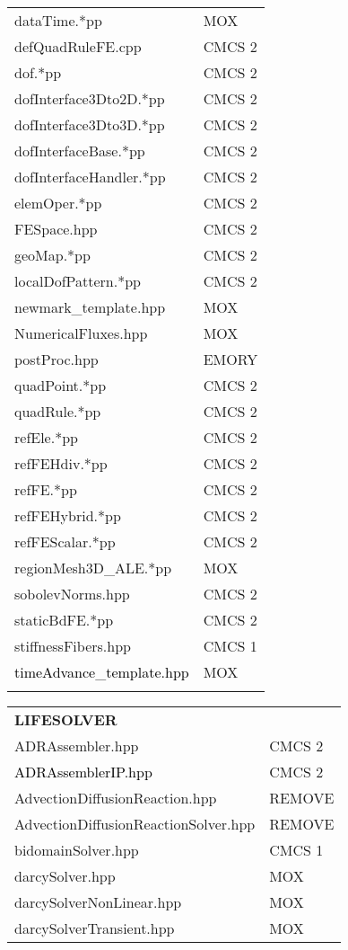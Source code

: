 \documentclass[10p]{article}
\newcommand{\newparts}[1]{\textcolor{black}{#1}}
\newcommand{\newpartsVC}[1]{\textcolor{black}{#1}}
\theoremstyle{definition}
\begin{document}
\begin{landscape}
\begin{table}[!h]
\begin{multicols}{4}
\begin{xtabular}{
p{0.18\textwidth}<{}|
p{0.1\textwidth}<{}
}
dataTime.*pp & MOX\\
defQuadRuleFE.cpp & CMCS 2\\
dof.*pp & CMCS 2\\
dofInterface3Dto2D.*pp & CMCS 2\\
dofInterface3Dto3D.*pp & CMCS 2\\
dofInterfaceBase.*pp & CMCS 2\\
dofInterfaceHandler.*pp & CMCS 2\\
elemOper.*pp & CMCS 2\\
FESpace.hpp & CMCS 2\\
geoMap.*pp & CMCS 2\\
localDofPattern.*pp & CMCS 2\\
newmark\_template.hpp & MOX\\
NumericalFluxes.hpp & MOX\\
postProc.hpp & EMORY\\
quadPoint.*pp & CMCS 2\\
quadRule.*pp & CMCS 2\\
refEle.*pp & CMCS 2\\
refFEHdiv.*pp & CMCS 2\\
refFE.*pp & CMCS 2\\
refFEHybrid.*pp & CMCS 2\\
refFEScalar.*pp & CMCS 2\\
regionMesh3D\_ALE.*pp & MOX\\
sobolevNorms.hpp & CMCS 2\\
staticBdFE.*pp & CMCS 2\\
stiffnessFibers.hpp & CMCS 1\\
\newpartsVC{timeAdvance\_template.hpp} & MOX\\
& \\
\end{xtabular}
\begin{xtabular}{
p{0.28\textwidth}<{}|
p{0.1\textwidth}<{}
}
\textbf{LIFESOLVER} \\
ADRAssembler.hpp & CMCS 2\\
\newparts{ADRAssemblerIP.hpp} & CMCS 2\\
AdvectionDiffusionReaction.hpp & REMOVE\\
AdvectionDiffusionReactionSolver.hpp & REMOVE\\
bidomainSolver.hpp & CMCS 1\\
darcySolver.hpp & MOX\\
darcySolverNonLinear.hpp & MOX\\
darcySolverTransient.hpp & MOX\\

\end{xtabular}
\end{multicols}
\end{table}
\end{landscape}
\end{document}
